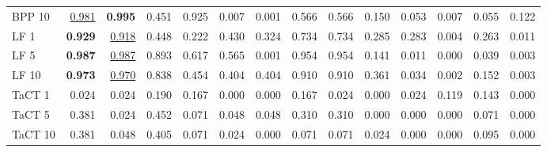 \begin{table}[htbp]
\begin{adjustbox}{max width=\textwidth}
\begin{tabular}{lrrrrrrrrrrrrr}
BPP 10 & \underline{0.981} & \textbf{0.995} & \textcolor{black!45}{0.451} & 0.925 & \textcolor{black!45}{0.007} & \textcolor{black!45}{0.001} & 0.566 & 0.566 & \textcolor{black!45}{0.150} & \textcolor{black!45}{0.053} & \textcolor{black!45}{0.007} & \textcolor{black!45}{0.055} & \textcolor{black!45}{0.122} \\
LF 1 & \textbf{0.929} & \underline{0.918} & \textcolor{black!45}{0.448} & \textcolor{black!45}{0.222} & \textcolor{black!45}{0.430} & \textcolor{black!45}{0.324} & 0.734 & 0.734 & \textcolor{black!45}{0.285} & \textcolor{black!45}{0.283} & \textcolor{black!45}{0.004} & \textcolor{black!45}{0.263} & \textcolor{black!45}{0.011} \\
LF 5 & \textbf{0.987} & \underline{0.987} & 0.893 & 0.617 & 0.565 & \textcolor{black!45}{0.001} & 0.954 & 0.954 & \textcolor{black!45}{0.141} & \textcolor{black!45}{0.011} & \textcolor{black!45}{0.000} & \textcolor{black!45}{0.039} & \textcolor{black!45}{0.003} \\
LF 10 & \textbf{0.973} & \underline{0.970} & 0.838 & \textcolor{black!45}{0.454} & \textcolor{black!45}{0.404} & \textcolor{black!45}{0.404} & 0.910 & 0.910 & \textcolor{black!45}{0.361} & \textcolor{black!45}{0.034} & \textcolor{black!45}{0.002} & \textcolor{black!45}{0.152} & \textcolor{black!45}{0.003} \\
TaCT 1 & \textcolor{black!45}{0.024} & \textcolor{black!45}{0.024} & \textcolor{black!45}{0.190} & \textcolor{black!45}{0.167} & \textcolor{black!45}{0.000} & \textcolor{black!45}{0.000} & \textcolor{black!45}{0.167} & \textcolor{black!45}{0.024} & \textcolor{black!45}{0.000} & \textcolor{black!45}{0.024} & \textcolor{black!45}{0.119} & \textcolor{black!45}{0.143} & \textcolor{black!45}{0.000} \\
TaCT 5 & \textcolor{black!45}{0.381} & \textcolor{black!45}{0.024} & \textcolor{black!45}{0.452} & \textcolor{black!45}{0.071} & \textcolor{black!45}{0.048} & \textcolor{black!45}{0.048} & \textcolor{black!45}{0.310} & \textcolor{black!45}{0.310} & \textcolor{black!45}{0.000} & \textcolor{black!45}{0.000} & \textcolor{black!45}{0.000} & \textcolor{black!45}{0.071} & \textcolor{black!45}{0.000} \\
TaCT 10 & \textcolor{black!45}{0.381} & \textcolor{black!45}{0.048} & \textcolor{black!45}{0.405} & \textcolor{black!45}{0.071} & \textcolor{black!45}{0.024} & \textcolor{black!45}{0.000} & \textcolor{black!45}{0.071} & \textcolor{black!45}{0.071} & \textcolor{black!45}{0.024} & \textcolor{black!45}{0.000} & \textcolor{black!45}{0.000} & \textcolor{black!45}{0.095} & \textcolor{black!45}{0.000} \\

\end{tabular}
\end{adjustbox}
\end{table}
